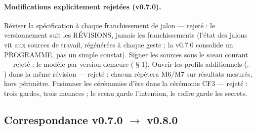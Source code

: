 \paragraph{Modifications explicitement rejetées (v0.7.0).} Réviser la spécification
à chaque franchissement de jalon — rejeté : le versionnement suit les RÉVISIONS,
jamais les franchissements (l'état des jalons vit aux sources de travail,
régénérées à chaque geste ; la v0.7.0 consolide un PROGRAMME, pas un simple
constat). Signer les sources  sous le sceau courant — rejeté : le
modèle par-version demeure ( § 1). Ouvrir les profils
additionnels (, ) dans la même
révision — rejeté : chacun répétera M6/M7 sur résultats mesurés, hors périmètre.
Fusionner les cérémonies d'ère dans la cérémonie CF3 — rejeté : trois gardes,
trois menaces ; le sceau garde l'intention, le coffre garde les secrets.

\subsection{Correspondance v0.7.0 $\to$ v0.8.0}\label{sec:evolutions080}


